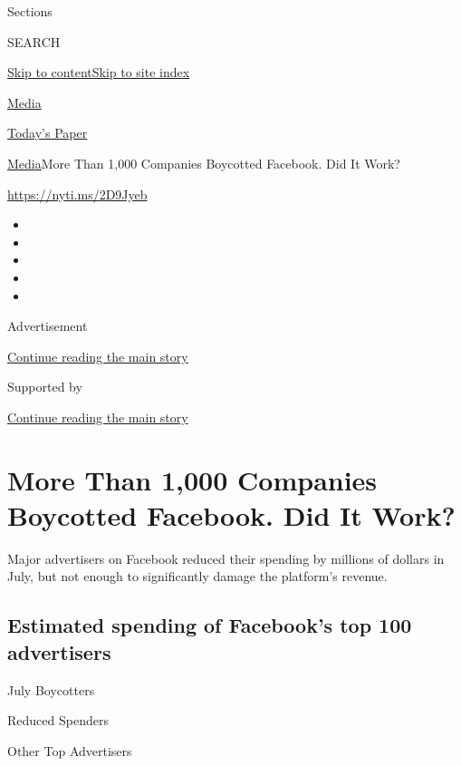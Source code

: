 Sections

SEARCH

\protect\hyperlink{site-content}{Skip to
content}\protect\hyperlink{site-index}{Skip to site index}

\href{https://www.nytimes.com/section/business/media}{Media}

\href{https://myaccount.nytimes.com/auth/login?response_type=cookie\&client_id=vi}{}

\href{https://www.nytimes.com/section/todayspaper}{Today's Paper}

\href{/section/business/media}{Media}\textbar{}More Than 1,000 Companies
Boycotted Facebook. Did It Work?

\url{https://nyti.ms/2D9Jyeb}

\begin{itemize}
\item
\item
\item
\item
\item
\end{itemize}

Advertisement

\protect\hyperlink{after-top}{Continue reading the main story}

Supported by

\protect\hyperlink{after-sponsor}{Continue reading the main story}

\hypertarget{more-than-1000-companies-boycotted-facebook-did-it-work}{%
\section{More Than 1,000 Companies Boycotted Facebook. Did It
Work?}\label{more-than-1000-companies-boycotted-facebook-did-it-work}}

Major advertisers on Facebook reduced their spending by millions of
dollars in July, but not enough to significantly damage the platform's
revenue.

\hypertarget{estimated-spending-of-facebooks-top-100-advertisers}{%
\subsection{Estimated spending of Facebook's top 100
advertisers}\label{estimated-spending-of-facebooks-top-100-advertisers}}

July Boycotters

Reduced Spenders

Other Top Advertisers


